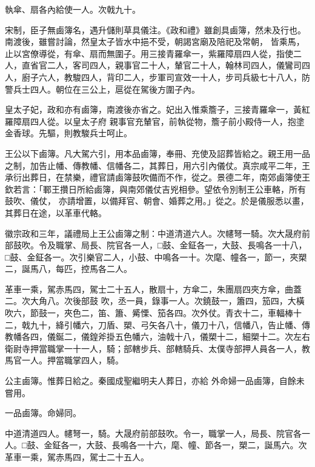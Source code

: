 \begin{pinyinscope}
 執傘、扇各內給使一人。次戟九十。



 宋制，臣子無鹵簿名，遇升儲則草具儀注。《政和禮》雖創具鹵簿，然未及行也。南渡後，雖嘗討論，然皇太子皆水中挹不受，朝謁宮廟及陪祀及常朝，
 皆乘馬，止以宮僚導從，有傘、扇而無圍子。用三接青羅傘一，紫羅障扇四人從，指使二人，直省官二人，客司四人，親事官二十人，輦官二十人，翰林司四人，儀鸞司四人，廚子六人，教駿四人，背印二人，步軍司宣效一十人，步司兵級七十八人，防警兵士四人。朝位在三公上，扈從在駕後方圍子內。



 皇太子妃，政和亦有鹵簿，南渡後亦省之。妃出入惟乘簷子，三接青羅傘一，黃紅羅障扇四人從。以皇太子府
 親事官充輦官，前執從物，簷子前小殿侍一人，抱塗金香球。先驅，則教駿兵士呵止。



 王公以下鹵簿。凡大駕六引，用本品鹵簿，奉冊、充使及詔葬皆給之。親王用一品之制，加告止幡、傳教幡、信幡各二，其葬日，用六引內儀仗。真宗咸平二年，王承衍出葬日，在禁樂，禮官請鹵簿鼓吹備而不作，從之。景德二年，南郊鹵簿使王欽若言：「鄆王攢日所給鹵簿，與南郊儀仗吉兇相參。望依令別制王公車輅，所有鼓吹、儀仗，
 亦請增置，以備拜官、朝會、婚葬之用。」從之。於是儀服悉以畫，其葬日在途，以革車代輅。



 徽宗政和三年，議禮局上王公鹵簿之制：中道清道六人。次幰弩一騎。次大晟府前部鼓吹。令及職掌、局長、院官各一人，□鼓、金鉦各一，大鼓、長鳴各一十八，□鼓、金鉦各一。次引樂官二人，小鼓、中鳴各一十。次麾、幢各一，節一，夾槊二，誕馬八，每匹，控馬各二人。



 革車一乘，駕赤馬四，駕士二十五人，散扇十，方傘二，朱團扇四夾方傘，曲蓋二。次大角八。次後部鼓
 吹，丞一員，錄事一人。次鐃鼓一，簫四，笳四，大橫吹六，節鼓一，夾色二，笛、簫、觱慄、笳各四。次外仗。青衣十二，車輻棒十二，戟九十，絳引幡六，刀盾、槊、弓矢各八十，儀刀十八，信幡八，告止幡、傳教幡各四，儀鋋二，儀鍠斧掛五色幡六，油戟十八，儀槊十二，細槊十二。次左右衛尉寺押當職掌一十一人，騎；部轄步兵、部轄騎兵、太僕寺部押人員各一人，教馬官一人。押當職掌四人，騎。



 公主鹵簿。惟葬日給之。秦國成聖繼明夫人葬日，亦給
 外命婦一品鹵簿，自餘未嘗用。



 一品鹵簿。命婦同。



 中道清道四人。幰弩一，騎。大晟府前部鼓吹。令一，職掌一人，局長、院官各一人。□鼓、金鉦各一，大鼓、長鳴各一十六，麾、幢、節各一，槊二，誕馬六。次革車一乘，駕赤馬四，駕士二十五人。




\end{pinyinscope}
